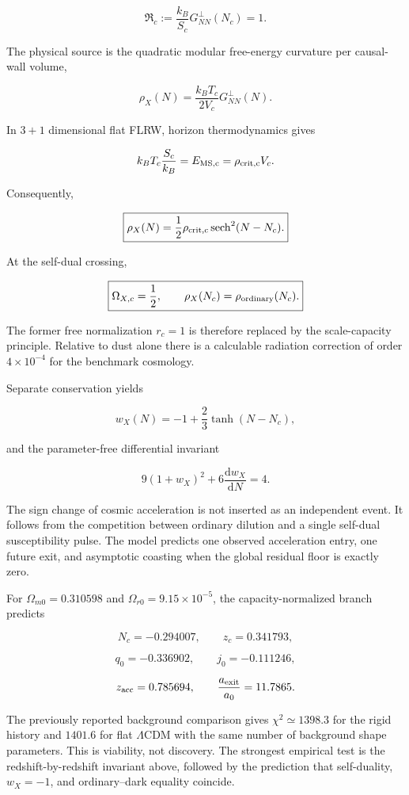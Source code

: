 \documentclass[
  11pt,
  letterpaper,
]{article}
\begin{document}
\[
\boxed{
\mathfrak R_c
:=\frac{k_B}{S_c}G^{\perp}_{NN}(N_c)=1.
}
\]

The physical source is the quadratic modular free-energy curvature per
causal-wall volume,

\[
\boxed{
\rho_X(N)=\frac{k_BT_c}{2V_c}G^{\perp}_{NN}(N).
}
\]

In \(3+1\) dimensional flat FLRW, horizon thermodynamics gives

\[
k_BT_c\frac{S_c}{k_B}
=E_{\rm MS,c}
=\rho_{\rm crit,c}V_c.
\]

Consequently,

\[
\boxed{
\rho_X(N)
=\frac12\rho_{\rm crit,c}\operatorname{sech}^2(N-N_c).
}
\]

At the self-dual crossing,

\[
\boxed{
\Omega_{X,c}=\frac12,
\qquad
\rho_X(N_c)=\rho_{\rm ordinary}(N_c).
}
\]

The former free normalization \(r_c=1\) is therefore replaced by the
scale-capacity principle. Relative to dust alone there is a calculable
radiation correction of order \(4\times10^{-4}\) for the benchmark
cosmology.

Separate conservation yields

\[
\boxed{
w_X(N)=-1+\frac23\tanh(N-N_c),
}
\]

and the parameter-free differential invariant

\[
\boxed{
9(1+w_X)^2+6\frac{\mathrm dw_X}{\mathrm dN}=4.
}
\]

The sign change of cosmic acceleration is not inserted as an independent
event. It follows from the competition between ordinary dilution and a
single self-dual susceptibility pulse. The model predicts one observed
acceleration entry, one future exit, and asymptotic coasting when the
global residual floor is exactly zero.

For \(\Omega_{m0}=0.310598\) and \(\Omega_{r0}=9.15\times10^{-5}\), the
capacity-normalized branch predicts

\[
N_c=-0.294007,
\qquad
z_c=0.341793,
\]

\[
q_0=-0.336902,
\qquad
j_0=-0.111246,
\]

\[
z_{\rm acc}=0.785694,
\qquad
\frac{a_{\rm exit}}{a_0}=11.7865.
\]

The previously reported background comparison gives
\(\chi^2\simeq1398.3\) for the rigid history and \(1401.6\) for flat
\(\Lambda\)CDM with the same number of background shape parameters. This
is viability, not discovery. The strongest empirical test is the
redshift-by-redshift invariant above, followed by the prediction that
self-duality, \(w_X=-1\), and ordinary--dark equality coincide.
\end{document}
